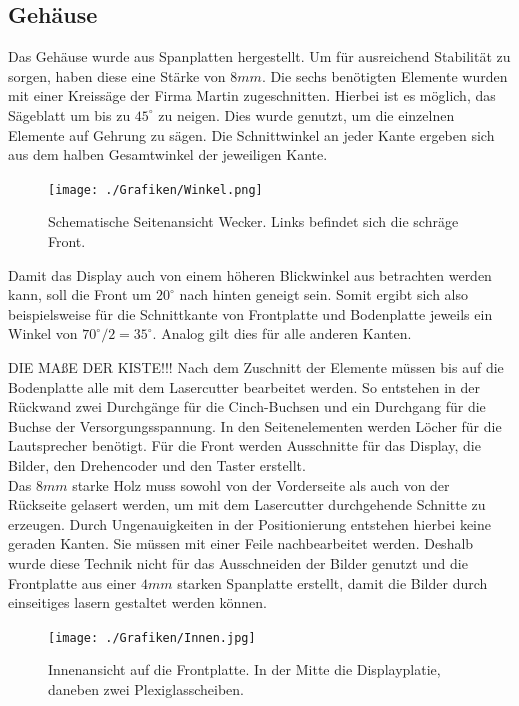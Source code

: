 \documentclass[journal, a4paper]{IEEEtran}
\begin{document}
		\subsection{Gehäuse}
			\label{sc:Hardware:subsc:Gehäuse}
			Das Gehäuse wurde aus Spanplatten hergestellt. Um für ausreichend Stabilität zu sorgen, haben diese eine Stärke von $8mm$. Die sechs benötigten Elemente wurden mit einer Kreissäge der Firma Martin zugeschnitten. Hierbei ist es möglich, das Sägeblatt um bis zu $45^{\circ}$ zu neigen. Dies wurde genutzt, um die einzelnen Elemente auf Gehrung zu sägen. Die Schnittwinkel an jeder Kante ergeben sich aus dem halben Gesamtwinkel der jeweiligen Kante.
				\begin{figure}
					\begin{center}	
						\texttt{[image: ./Grafiken/Winkel.png]}
						\caption{Schematische Seitenansicht Wecker. Links befindet sich die schräge Front.}
						\label{fig:Winkel}
					\end{center}
				\end{figure}	
			Damit das Display auch von einem höheren Blickwinkel aus betrachten werden kann, soll die Front um $20^{\circ}$ nach hinten geneigt sein. Somit ergibt sich also beispielsweise für die Schnittkante von Frontplatte und Bodenplatte jeweils ein Winkel von $70^{\circ} / 2 = 35^{\circ}$. Analog gilt dies für alle anderen Kanten.\par
			DIE MAßE DER KISTE!!!
			Nach dem Zuschnitt der Elemente müssen bis auf die Bodenplatte alle mit dem Lasercutter bearbeitet werden. So entstehen in der Rückwand zwei Durchgänge für die Cinch-Buchsen und ein Durchgang für die Buchse der Versorgungsspannung. In den Seitenelementen werden Löcher für die Lautsprecher benötigt. Für die Front werden Ausschnitte für das Display, die Bilder, den Drehencoder und den Taster erstellt.\\
			Das $8mm$ starke Holz muss sowohl von der Vorderseite als auch von der Rückseite gelasert werden, um mit dem Lasercutter durchgehende Schnitte zu erzeugen. Durch Ungenauigkeiten in der Positionierung entstehen hierbei keine geraden Kanten. Sie müssen mit einer Feile nachbearbeitet werden. Deshalb wurde diese Technik nicht für das Ausschneiden der Bilder genutzt und die Frontplatte aus einer $4mm$ starken Spanplatte erstellt, damit die Bilder durch einseitiges lasern gestaltet werden können.\\
			\begin{figure}
				\begin{center}	
					\texttt{[image: ./Grafiken/Innen.jpg]}
					\caption{Innenansicht auf die Frontplatte. In der Mitte die Displayplatie, daneben zwei Plexiglasscheiben.}
					\label{fig:Innen}
				\end{center}
			\end{figure}	
\end{document}
